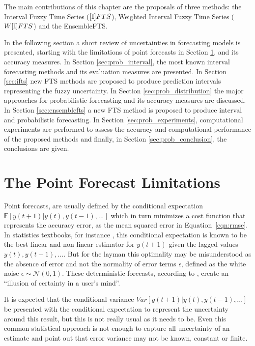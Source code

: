 The main contributions of this chapter are the proposals of three methods: the Interval Fuzzy Time Series ($[\mathbb{I}]FTS$),  Weighted Interval Fuzzy Time Series ($W[\mathbb{I}]FTS$) and the EnsembleFTS. 

In the following section a short review of uncertainties in forecasting models is presented, starting with the limitations of point forecasts in Section \ref{sec:prob_point}, and its accuracy measures. In Section \ref{sec:prob_interval}, the most known interval forecasting methods and its evaluation measures are presented. In Section \ref{sec:ifts} new FTS methods are proposed to produce prediction intervals representing the fuzzy uncertainty. In Section \ref{sec:prob_distribution} the major approaches for probabilistic forecasting and its accuracy measures are discussed. In Section \ref{sec:ensemblefts} a new FTS method is proposed to produce interval and probabilistic forecasting. In Section \ref{sec:prob_experiments}, computational experiments are performed to assess the accuracy and computational performance of the proposed methods and finally, in Section \ref{sec:prob_conclusion}, the conclusions are given. 

%
\section{The Point Forecast Limitations}
\label{sec:prob_point}


Point forecasts, are usually defined by the conditional expectation $\mathbb{E}[y(t+1)|y(t),y(t-1),...]$ which in turn minimizes a cost function that represents the accuracy error, as the mean squared error in Equation~\eqref{eqn:rmse}. In statistics textbooks, for instance \cite{Kay2006}, this conditional expectation is  known to be the best linear and non-linear estimator for $y(t+1)$ given the lagged values $y(t),y(t-1),...$. But for the layman this optimality may be misunderstood as the absence of error and not the normality of error terms $\epsilon$, defined as the white noise $\epsilon \sim \mathcal{N}(0,1)$. These deterministic forecasts, according to \cite{Krzysztofowicz2001}, create an ``illusion of certainty in a user's mind''. 

It is expected that the conditional variance $Var[y(t+1)|y(t),y(t-1),...]$ be presented with the conditional expectation to represent the uncertainty around this result, but this is not really usual as it needs to be. Even this common statistical approach is not enough to capture all uncertainty of an estimate and \cite{Makridakis2009} point out that error variance may not be known, constant or finite.

